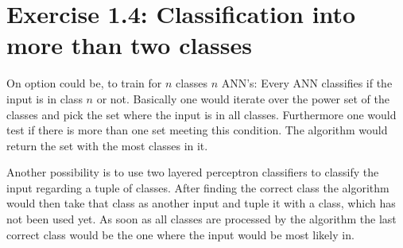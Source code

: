 \documentclass{scrartcl}
\begin{document}
\clearpage{}

\section{Exercise 1.4: Classification into more than two classes}
\begin{enumeration}
\item On option could be, to train for $n$ classes $n$ ANN's: Every ANN classifies if the input is in class $n$ or not. Basically one would iterate over the power set of the classes and pick the set where the input is in all classes.
Furthermore one would test if there is more than one set meeting this condition. The algorithm would return the set with the most classes in it.

\item Another possibility is to use two layered perceptron classifiers to classify the input regarding a tuple of classes. After finding the correct class the algorithm would then take that class as another input and tuple it with a class, which has not been used yet.
As soon as all classes are processed by the algorithm the last correct class would be the one where the input would be most likely in.
\end{enumeration}
\end{document}
